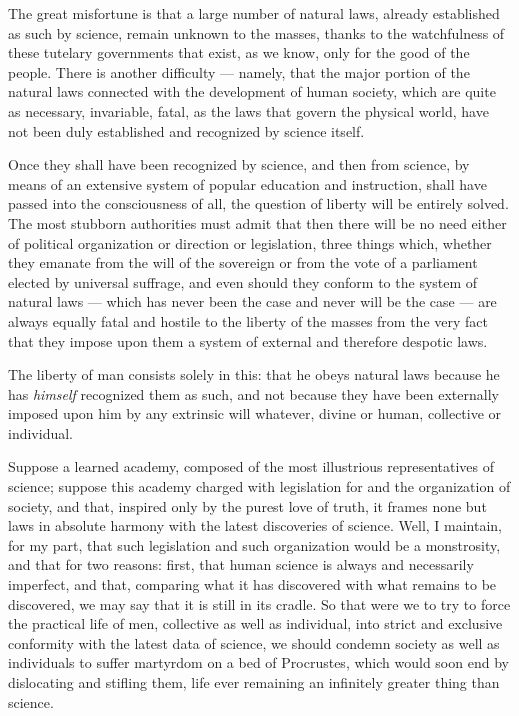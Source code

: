 \documentclass[12pt]{report}
\begin{document}
The great misfortune is that a large number of natural laws, already established as such by science, remain unknown to the masses, thanks to the watchfulness of these tutelary governments that exist, as we know, only for the good of the people. There is another difficulty — namely, that the major portion of the natural laws connected with the development of human society, which are quite as necessary, invariable, fatal, as the laws that govern the physical world, have not been duly established and recognized by science itself.


Once they shall have been recognized by science, and then from science, by means of an extensive system of popular education and instruction, shall have passed into the consciousness of all, the question of liberty will be entirely solved. The most stubborn authorities must admit that then there will be no need either of political organization or direction or legislation, three things which, whether they emanate from the will of the sovereign or from the vote of a parliament elected by universal suffrage, and even should they conform to the system of natural laws — which has never been the case and never will be the case — are always equally fatal and hostile to the liberty of the masses from the very fact that they impose upon them a system of external and therefore despotic laws.


The liberty of man consists solely in this: that he obeys natural laws because he has \emph{himself} recognized them as such, and not because they have been externally imposed upon him by any extrinsic will whatever, divine or human, collective or individual.


Suppose a learned academy, composed of the most illustrious representatives of science; suppose this academy charged with legislation for and the organization of society, and that, inspired only by the purest love of truth, it frames none but laws in absolute harmony with the latest discoveries of science. Well, I maintain, for my part, that such legislation and such organization would be a monstrosity, and that for two reasons: first, that human science is always and necessarily imperfect, and that, comparing what it has discovered with what remains to be discovered, we may say that it is still in its cradle. So that were we to try to force the practical life of men, collective as well as individual, into strict and exclusive conformity with the latest data of science, we should condemn society as well as individuals to suffer martyrdom on a bed of Procrustes, which would soon end by dislocating and stifling them, life ever remaining an infinitely greater thing than science.
\end{document}
